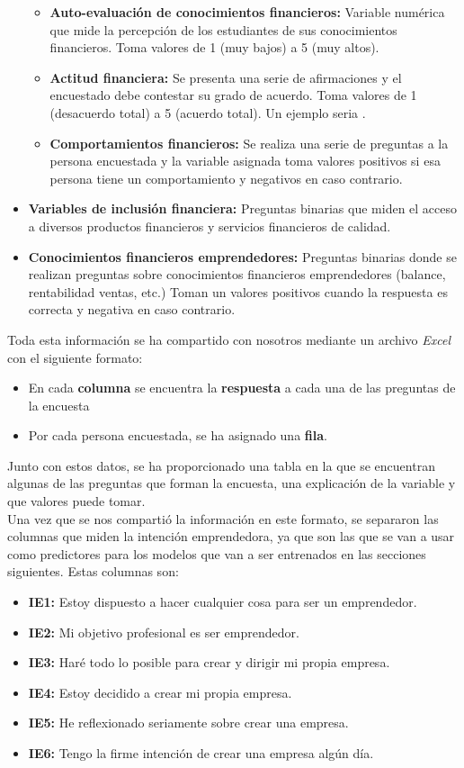 \begin{itemize}
\begin{itemize}
		      \item \textbf{Auto-evaluación de conocimientos financieros:} Variable numérica que mide la percepción de los estudiantes de sus conocimientos financieros. Toma valores de 1 (muy bajos) a 5 (muy altos).
		      \item \textbf{Actitud financiera:} Se presenta una serie de afirmaciones y el encuestado debe contestar su grado de acuerdo. Toma valores de 1 (desacuerdo total) a 5 (acuerdo total). Un ejemplo seria .
		      \item \textbf{Comportamientos financieros:} Se realiza una serie de preguntas a la persona encuestada y la variable asignada toma valores positivos si esa persona tiene un comportamiento y negativos en caso contrario.
	      \end{itemize}
	\item \textbf{Variables de inclusión financiera:} Preguntas binarias que miden el acceso a diversos productos financieros y servicios financieros de calidad.
	\item \textbf{Conocimientos financieros emprendedores:} Preguntas binarias donde se realizan preguntas sobre conocimientos financieros emprendedores (balance, rentabilidad ventas, etc.) Toman un valores positivos cuando la respuesta es correcta y negativa en caso contrario.
\end{itemize}
\clearpage
Toda esta información se ha compartido con nosotros mediante un archivo \textit{Excel} con el siguiente formato:
\begin{itemize}
	\item En cada \textbf{columna} se encuentra la \textbf{respuesta} a cada una de las preguntas de la encuesta
	\item Por cada persona encuestada, se ha asignado una \textbf{fila}.
\end{itemize}
Junto con estos datos, se ha proporcionado una tabla en la que se encuentran algunas de las preguntas que forman la encuesta, una explicación de la variable y que valores puede tomar.\\
\linebreak
Una vez que se nos compartió la información en este formato, se separaron las columnas que miden la intención emprendedora, ya que son las que se van a usar como predictores para los modelos que van a ser entrenados en las secciones siguientes. Estas columnas son: 
\begin{itemize}
	\item \textbf{IE1:} Estoy dispuesto a hacer cualquier cosa para ser un emprendedor.
	\item \textbf{IE2:} Mi objetivo profesional es ser emprendedor.
	\item \textbf{IE3:} Haré todo lo posible para crear y dirigir mi propia empresa.
	\item \textbf{IE4:} Estoy decidido a crear mi propia empresa.
	\item \textbf{IE5:} He reflexionado seriamente sobre crear una empresa.
	\item \textbf{IE6:} Tengo la firme intención de crear una empresa algún día.
\end{itemize}
